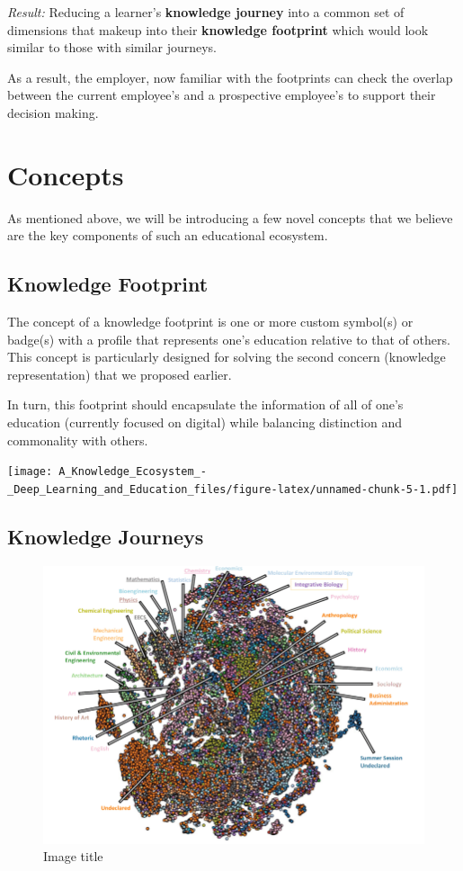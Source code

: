 \documentclass[]{book}
\theoremstyle{definition}
\theoremstyle{definition}
\theoremstyle{definition}
\theoremstyle{remark}
\begin{document}
\emph{Result:} Reducing a learner's \textbf{knowledge journey} into a
common set of dimensions that makeup into their \textbf{knowledge
footprint} which would look similar to those with similar journeys.

As a result, the employer, now familiar with the footprints can check
the overlap between the current employee's and a prospective employee's
to support their decision making.

\chapter{Concepts}\label{concepts}

As mentioned above, we will be introducing a few novel concepts that we
believe are the key components of such an educational ecosystem.

\section{Knowledge Footprint}\label{knowledge-footprint}

The concept of a knowledge footprint is one or more custom symbol(s) or
badge(s) with a profile that represents one's education relative to that
of others. This concept is particularly designed for solving the second
concern (knowledge representation) that we proposed earlier.

In turn, this footprint should encapsulate the information of all of
one's education (currently focused on digital) while balancing
distinction and commonality with others.

\texttt{[image: A\_Knowledge\_Ecosystem\_-\_Deep\_Learning\_and\_Education\_files/figure-latex/unnamed-chunk-5-1.pdf]}

\section{Knowledge Journeys}\label{knowledge-journeys}

\begin{figure}
\centering
\includegraphics{img/tsne.png}
\caption{Image title}
\end{figure}
\end{document}
